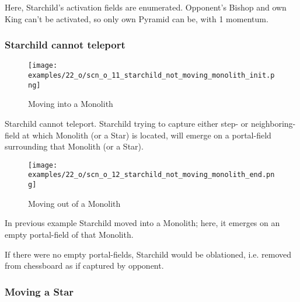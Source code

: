 Here, Starchild's activation fields are enumerated. Opponent's Bishop and own King can't
be activated, so only own Pyramid can be, with 1 momentum.

\clearpage %

\subsubsection*{Starchild cannot teleport}

\noindent
\begin{wrapfigure}[6]{l}{0.4\textwidth}
\centering
\texttt{[image: examples/22\_o/scn\_o\_11\_starchild\_not\_moving\_monolith\_init.png]}
\caption{Moving into a Monolith}
\label{fig:scn_o_11_starchild_not_moving_monolith_init}
\end{wrapfigure}
Starchild cannot teleport. Starchild trying to capture either step- or neighboring-field at
which Monolith (or a Star) is located, will emerge on a portal-field surrounding that
Monolith (or a Star).

\vspace*{5.1\baselineskip}
\noindent
\begin{wrapfigure}[8]{l}{0.4\textwidth}
\centering
\texttt{[image: examples/22\_o/scn\_o\_12\_starchild\_not\_moving\_monolith\_end.png]}
\caption{Moving out of a Monolith}
\label{fig:scn_o_12_starchild_not_moving_monolith_end}
\end{wrapfigure}
In previous example Starchild moved into a Monolith; here, it emerges on an empty portal-field
of that Monolith.

If there were no empty portal-fields, Starchild would be oblationed, i.e. removed from chessboard
as if captured by opponent.

\clearpage %

\subsubsection*{Moving a Star}

